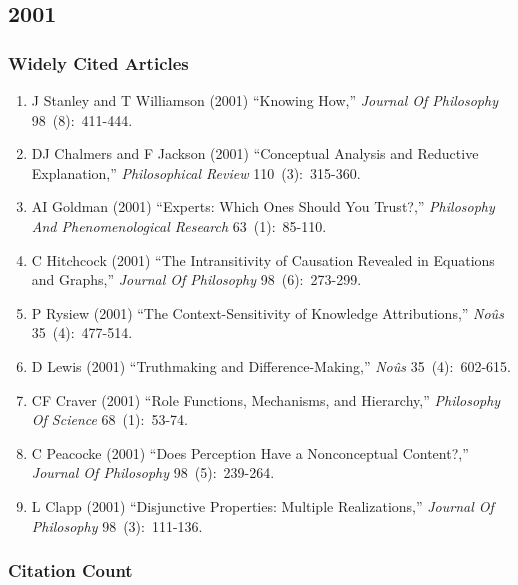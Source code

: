 \documentclass[
  10pt,
  letterpaper,
  DIV=11,
  numbers=noendperiod,
  twoside]{scrartcl}
\providecommand{\tightlist}{%
  \setlength{\itemsep}{0pt}\setlength{\parskip}{0pt}}\usepackage{longtable,booktabs,array}
\begin{document}
\newpage

\subsection{2001}\label{sec-s2001}

\subsubsection*{Widely Cited Articles}\label{widely-cited-articles-44}

\begin{enumerate}
\def\labelenumi{\arabic{enumi}.}
\tightlist
\item
  J Stanley and T Williamson (2001) ``Knowing How,'' \emph{Journal Of
  Philosophy} 98~(8):~411-444.
\item
  DJ Chalmers and F Jackson (2001) ``Conceptual Analysis and Reductive
  Explanation,'' \emph{Philosophical Review} 110~(3):~315-360.
\item
  AI Goldman (2001) ``Experts: Which Ones Should You Trust?,''
  \emph{Philosophy And Phenomenological Research} 63~(1):~85-110.
\item
  C Hitchcock (2001) ``The Intransitivity of Causation Revealed in
  Equations and Graphs,'' \emph{Journal Of Philosophy} 98~(6):~273-299.
\item
  P Rysiew (2001) ``The Context-Sensitivity of Knowledge Attributions,''
  \emph{Noûs} 35~(4):~477-514.
\item
  D Lewis (2001) ``Truthmaking and Difference-Making,'' \emph{Noûs}
  35~(4):~602-615.
\item
  CF Craver (2001) ``Role Functions, Mechanisms, and Hierarchy,''
  \emph{Philosophy Of Science} 68~(1):~53-74.
\item
  C Peacocke (2001) ``Does Perception Have a Nonconceptual Content?,''
  \emph{Journal Of Philosophy} 98~(5):~239-264.
\item
  L Clapp (2001) ``Disjunctive Properties: Multiple Realizations,''
  \emph{Journal Of Philosophy} 98~(3):~111-136.
\end{enumerate}

\subsubsection*{Citation Count}\label{sec-count-2001}
\end{document}
